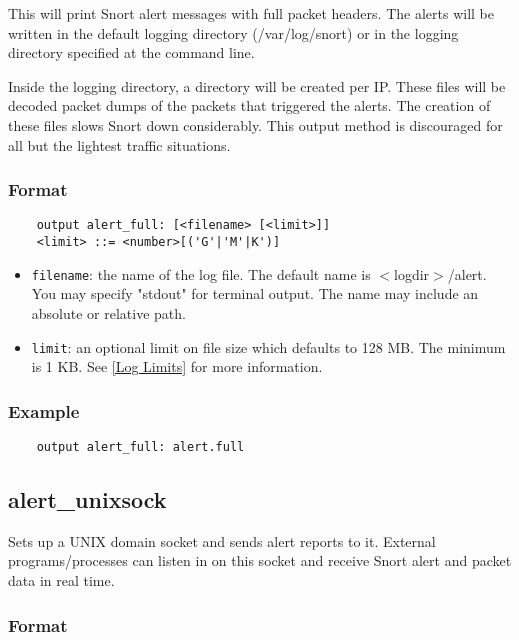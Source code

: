 \documentclass[english]{report}
\begin{document}
This will print Snort alert messages with full packet headers. The alerts will
be written in the default logging directory (/var/log/snort) or in the logging
directory specified at the command line.

Inside the logging directory, a directory will be created per IP.  These files
will be decoded packet dumps of the packets that triggered the alerts. The
creation of these files slows Snort down considerably.  This output method is
discouraged for all but the lightest traffic situations.

\subsubsection{Format}

\begin{verbatim}
    output alert_full: [<filename> [<limit>]]
    <limit> ::= <number>[('G'|'M'|K')]
\end{verbatim}

\begin{itemize}
\item \texttt{filename}: the name of the log file.  The default name is
$<$logdir$>$/alert.  You may specify "stdout" for terminal output.  The name may
include an absolute or relative path.

\item \texttt{limit}: an optional limit on file size which defaults to 128 MB.  
The minimum is 1 KB.  See \ref{Log Limits} for more information.
\end{itemize}

\subsubsection{Example}

\begin{verbatim}
    output alert_full: alert.full
\end{verbatim}

\subsection{alert\_unixsock}

Sets up a UNIX domain socket and sends alert reports to it. External
programs/processes can listen in on this socket and receive Snort alert and
packet data in real time.

\subsubsection{Format}
\end{document}
